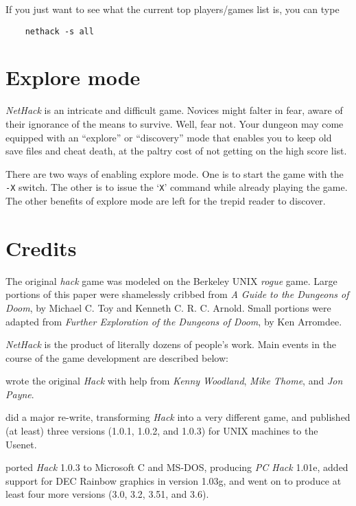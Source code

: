 If you just want to see what the current top players/games list is, you
can type
\begin{verbatim}
    nethack -s all
\end{verbatim}

\section{Explore mode}

{\it NetHack\/} is an intricate and difficult game.  Novices might falter
in fear, aware of their ignorance of the means to survive.  Well, fear
not.  Your dungeon may come equipped with an ``explore'' or ``discovery''
mode that enables you to keep old save files and cheat death, at the
paltry cost of not getting on the high score list.

There are two ways of enabling explore mode.  One is to start the game
with the
{\tt -X}
switch.  The other is to issue the `{\tt X}' command while already playing
the game.  The other benefits of explore mode are left for the trepid
reader to discover.

\section{Credits}
The original %
{\it hack\/} game was modeled on the Berkeley UNIX
{\it rogue\/} game.  Large portions of this paper were shamelessly
cribbed from %
{\it A Guide to the Dungeons of Doom}, by Michael C. Toy
and Kenneth C. R. C. Arnold.  Small portions were adapted from
{\it Further Exploration of the Dungeons of Doom}, by Ken Arromdee.

{\it NetHack\/} is the product of literally dozens of people's work.
Main events in the course of the game development are described below:

\bigskip
{} wrote the original {\it Hack\/} with help from {\it
Kenny Woodland}, {\it Mike Thome}, and {\it Jon Payne}.

\medskip
{} did a major re-write, transforming {\it Hack\/}
into a very different game, and published (at least) three versions (1.0.1,
1.0.2, and 1.0.3) for UNIX machines to the Usenet.

\medskip
{} ported {\it Hack\/} 1.0.3 to Microsoft C and MS-DOS,
producing {\it PC Hack\/} 1.01e, added support for DEC Rainbow graphics in
version 1.03g, and went on to produce at least four more versions (3.0, 3.2,
3.51, and 3.6).

